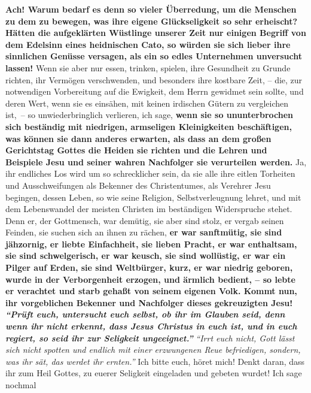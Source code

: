 \medskip

\label{ref:18_11_ueberredung}
\textbf{Ach! Warum bedarf es denn so vieler Überredung, um die Menschen zu dem
zu
bewegen, was ihre eigene Glückseligkeit so sehr erheischt? Hätten die
aufgeklärten Wüstlinge unserer Zeit nur einigen Begriff von dem Edelsinn eines
heidnischen Cato, so würden sie sich lieber ihre
sinnlichen Genüsse
versagen, als ein so edles Unternehmen unversucht lassen!} Wenn sie aber nur
essen, trinken, spielen, ihre Gesundheit zu Grunde richten, ihr Vermögen
verschwenden, und besonders ihre kostbare Zeit, -- die, zur notwendigen
Vorbereitung auf die Ewigkeit, dem Herrn gewidmet sein sollte, und deren Wert,
wenn sie es einsähen, mit keinen irdischen Gütern zu vergleichen ist,~-- so
unwiederbringlich verlieren, ich sage, \textbf{wenn sie so ununterbrochen sich
beständig mit niedrigen, armseligen Kleinigkeiten beschäftigen, was können sie
dann anderes erwarten, als dass an dem großen Gerichtstag Gottes die
Heiden sie
richten und die Lehren und Beispiele Jesu und seiner wahren Nachfolger sie
verurteilen werden.} Ja, ihr endliches Los wird um so schrecklicher sein, da
sie alle ihre eitlen Torheiten und Ausschweifungen als Bekenner des
Christentumes, als Verehrer Jesu begingen, dessen Leben, so wie seine
Religion, Selbstverleugnung lehret, und mit dem Lebenswandel der meisten
Christen im beständigen Widerspruche stehet. Denn er, der
Gottmensch, war
demütig, sie aber sind stolz, er vergab seinen Feinden, sie suchen sich an
ihnen zu rächen, \textbf{er war sanftmütig, sie sind jähzornig, er liebte
Einfachheit,
sie lieben Pracht, er war enthaltsam, sie sind schwelgerisch, er war keusch, sie
sind wollüstig, er war ein Pilger auf Erden, sie sind Weltbürger, kurz, er war
niedrig geboren, wurde in der Verborgenheit erzogen, und ärmlich bedient, -- so
lebte er verachtet und starb gehaßt von seinem eigenen Volk. Kommt nun, ihr
vorgeblichen Bekenner und Nachfolger dieses gekreuzigten Jesu!
\textit{"`Prüft euch,
untersucht euch selbst, ob ihr im Glauben seid, denn wenn ihr nicht erkennt,
dass Jesus Christus in euch ist, und in euch regiert, so seid ihr zur
Seligkeit ungeeignet."'}}
\textit{"`Irrt euch
nicht, Gott lässt sich nicht spotten und endlich mit einer erzwungenen Reue
befriedigen, sondern, was ihr sät, das werdet ihr ernten."'}
Ich bitte euch, höret mich! Denkt daran, dass ihr zum Heil Gottes, zu
euerer Seligkeit eingeladen und gebeten wurdet! Ich sage nochmal
